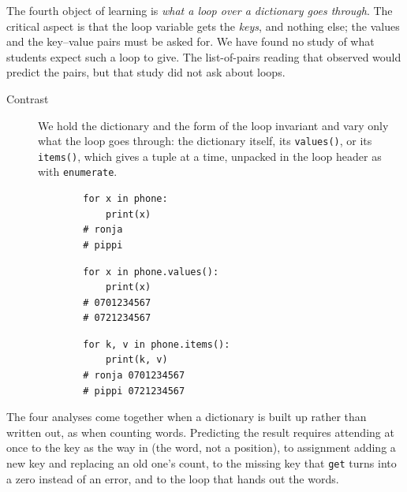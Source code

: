 The fourth object of learning is \emph{what a loop over a dictionary goes
through}. The critical aspect is that the loop variable gets the \emph{keys},
and nothing else; the values and the key--value pairs must be asked for.
We have found no study of what students expect such a loop to give. The
list-of-pairs reading that \textcite{Stansbury2015Dictionaries} observed would
predict the pairs, but that study did not ask about loops.

\begin{description}
  \item[Contrast] We hold the dictionary and the form of the loop invariant and
    vary only what the loop goes through: the dictionary itself, its
    \texttt{values()}, or its \texttt{items()}, which
    gives a tuple at a time, unpacked in the loop header as with
    \texttt{enumerate}.

    \hfill
    \begin{minipage}[t]{0.3\columnwidth}
      \begin{verbatim}
        for x in phone:
            print(x)
        # ronja
        # pippi
      \end{verbatim}
    \end{minipage}
    \hfill
    \begin{minipage}[t]{0.3\columnwidth}
      \begin{verbatim}
        for x in phone.values():
            print(x)
        # 0701234567
        # 0721234567
      \end{verbatim}
    \end{minipage}
    \hfill
    \begin{minipage}[t]{0.3\columnwidth}
      \begin{verbatim}
        for k, v in phone.items():
            print(k, v)
        # ronja 0701234567
        # pippi 0721234567
      \end{verbatim}
    \end{minipage}
\end{description}

The four analyses come together when a dictionary is built up rather than
written out, as when counting words. Predicting the result requires attending
at once to the key as the way in (the word, not a position), to assignment
adding a new key and replacing an old one's count, to the missing key that
\texttt{get} turns into a zero instead of an error, and to the loop
that hands out the words.

